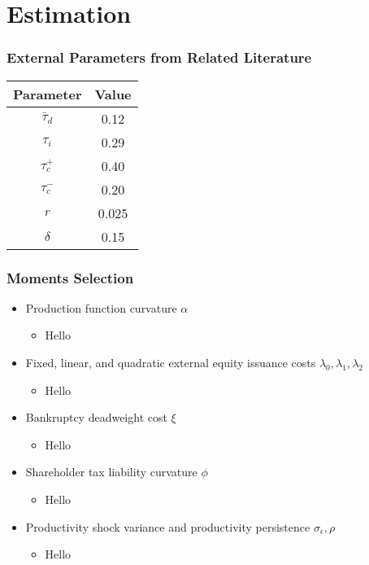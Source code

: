 \documentclass[usenames,dvipsnames, handout]{beamer}
\begin{document}
\section{Estimation}

\begin{frame}
\frametitle{External Parameters from Related Literature}
\small
\begin{center}
\begin{tabular}{ cc } 
 \hline
 Parameter    & Value \\ 
 \hline
 $\bar\tau_d$ & 0.12 \\ 
 $\tau_i$     & 0.29 \\ 
 $\tau_c^+$   & 0.40 \\ 
 $\tau_c^-$   & 0.20 \\ 
 $r$          & 0.025 \\
 $\delta$     & 0.15 \\
 \hline 
\end{tabular}
\end{center}
\end{frame}


\begin{frame}
\frametitle{Moments Selection}
\small
\begin{itemize}
\item Production function curvature $\alpha$
\begin{itemize}
\item Hello
\end{itemize}
\item Fixed, linear, and quadratic external equity issuance costs $\lambda_0, \lambda_1, \lambda_2$
\begin{itemize}
\item Hello
\end{itemize}
\item Bankruptcy deadweight cost $\xi$
\begin{itemize}
\item Hello
\end{itemize}
\item Shareholder tax liability curvature $\phi$
\begin{itemize}
\item Hello
\end{itemize}
\item Productivity shock variance and productivity persistence  $\sigma_\epsilon, \rho$
\begin{itemize}
\item Hello
\end{itemize}
\end{itemize}
\end{frame}
\end{document}
